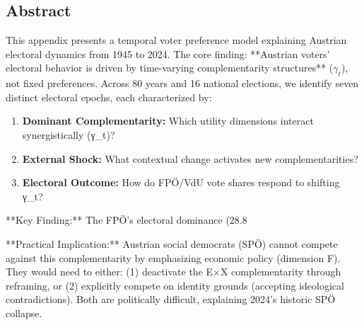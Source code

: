 \clearpage


\subsection*{Abstract}

This appendix presents a temporal voter preference model explaining Austrian electoral dynamics from 1945 to 2024. The core finding: **Austrian voters' electoral behavior is driven by time-varying complementarity structures** ($\gamma_t$), not fixed preferences. Across 80 years and 16 national elections, we identify seven distinct electoral epochs, each characterized by:

\begin{enumerate}

\item \textbf{Dominant Complementarity:} Which utility dimensions interact synergistically (γ_t)?
\item \textbf{External Shock:} What contextual change activates new complementarities?
\item \textbf{Electoral Outcome:} How do FPÖ/VdU vote shares respond to shifting γ_t?

\end{enumerate}

**Key Finding:** The FPÖ's electoral dominance (28.8%

**Practical Implication:** Austrian social democrats (SPÖ) cannot compete against this complementarity by emphasizing economic policy (dimension F). They would need to either: (1) deactivate the E×X complementarity through reframing, or (2) explicitly compete on identity grounds (accepting ideological contradictions). Both are politically difficult, explaining 2024's historic SPÖ collapse.


